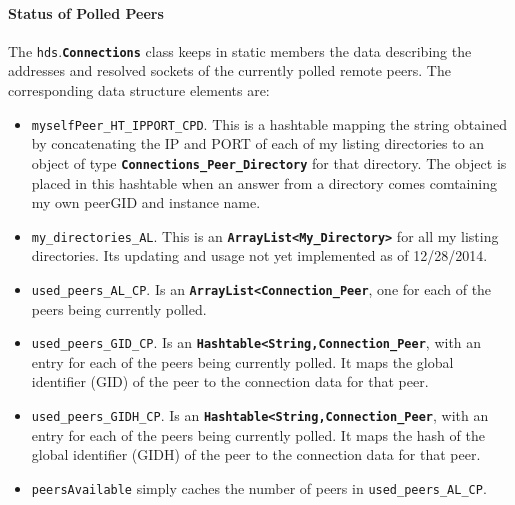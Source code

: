 \documentclass{book}
\newcommand{\pkg}[1]{{\tt #1}}
\newcommand{\cls}[1]{{\tt\bf #1}}
\newcommand{\mmb}[1]{{\tt #1}}
\begin{document}
\paragraph{Status of Polled Peers}
The \pkg{hds}.\cls{Connections} class keeps in static members the data describing the addresses and resolved sockets of the currently
polled remote peers.
The corresponding data structure elements are:
\begin{itemize}
\item
\mmb{myselfPeer\_HT\_IPPORT\_CPD}. This is a hashtable mapping the string obtained by concatenating the IP and PORT
of each of my listing directories to an object of type \cls{Connections\_Peer\_Directory} for that directory.
The object is placed in this hashtable when an answer from a directory comes comtaining my own peerGID and instance name.
\item
\mmb{my\_directories\_AL}. This is an \cls{ArrayList<My\_Directory>} for all my listing directories. Its updating and usage not yet implemented as of 12/28/2014.
\item
\mmb{used\_peers\_AL\_CP}. Is an \cls{ArrayList<Connection\_Peer}, one for each of the peers being currently polled.
\item
\mmb{used\_peers\_GID\_CP}. Is an \cls{Hashtable<String,Connection\_Peer}, with an entry for each of the peers being currently polled.
It maps the global identifier (GID) of the peer to the connection data for that peer.
\item
\mmb{used\_peers\_GIDH\_CP}. Is an \cls{Hashtable<String,Connection\_Peer}, with an entry for each of the peers being currently polled.
It maps the hash of the global identifier (GIDH) of the peer to the connection data for that peer.
\item
\mmb{peersAvailable} simply caches the number of peers in \mmb{used\_peers\_AL\_CP}.
\end{itemize}
\end{document}
